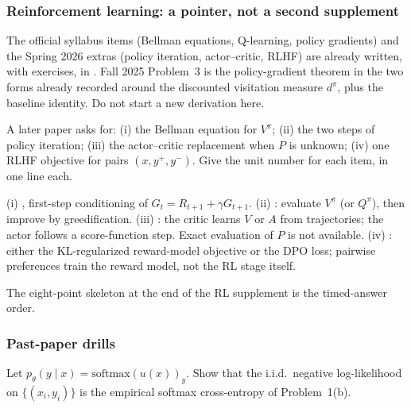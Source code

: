 \subsubsection{Reinforcement learning: a pointer, not a second supplement}
\label{subsubsec:dlu-rl-ptr}

The official syllabus items (Bellman equations, Q-learning, policy gradients) and the Spring 2026 extras (policy iteration, actor--critic, RLHF) are already written, with exercises, in . Fall 2025 Problem~3 is the policy-gradient theorem in the two forms already recorded around the discounted visitation measure \(d^\pi\), plus the baseline identity. Do not start a new derivation here.

\begin{exercise}
\label{ex:dlu-rl-map}
A later paper asks for: (i) the Bellman equation for \(V^\pi\); (ii) the two steps of policy iteration; (iii) the actor--critic replacement when \(P\) is unknown; (iv) one RLHF objective for pairs \((x,y^+,y^-)\). Give the unit number for each item, in one line each.
\end{exercise}

\begin{solution}
(i) , first-step conditioning of \(G_t=R_{t+1}+\gamma G_{t+1}\).
(ii) : evaluate \(V^\pi\) (or \(Q^\pi\)), then improve by greedification.
(iii) : the critic learns \(V\) or \(A\) from trajectories; the actor follows a score-function step. Exact evaluation of \(P\) is not available.
(iv) : either the KL-regularized reward-model objective or the DPO loss; pairwise preferences train the reward model, not the RL stage itself.

The eight-point skeleton at the end of the RL supplement is the timed-answer order.
\end{solution}


\subsubsection{Past-paper drills}
\label{subsubsec:dlu-drills}

\begin{exercise}
\label{ex:dlu-ce}
Let \(p_\theta(y\mid x)=\mathrm{softmax}(u(x))_y\). Show that the i.i.d.\ negative log-likelihood on \(\{(x_i,y_i)\}\) is the empirical softmax cross-entropy of Problem~1(b).
\end{exercise}

